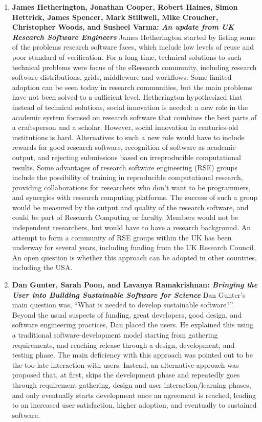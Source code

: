 \documentclass[11pt, oneside]{amsart}
\begin{document}
\begin{enumerate}
\item \textbf{James Hetherington, Jonathan Cooper, Robert Haines, Simon
Hettrick, James Spencer, Mark Stillwell, Mike Croucher, Christopher Woods, and
Susheel Varma: \textit{An update from UK Research Software Engineers}} James
Hetherington started by listing some of the problems research software faces,
which include low levels of reuse and poor standard of verification. For a long
time, technical solutions to such technical problems were focus of the eResearch
community, including research software distributions, grids, middleware and
workflows. Some limited adoption can be seen today in research communities, but
the main problems have not been solved to a sufficient level. Hetherington
hypothesized that instead of technical solutions, social innovation is needed: a
new role in the academic system focused on research software that combines the
best parts of a craftsperson and a scholar. However, social innovation in
centuries-old institutions is hard. Alternatives to such a new role would have
to include rewards for good research software, recognition of software as
academic output, and rejecting submissions based on irreproducible computational
results. Some advantages of research software engineering (RSE) groups include
the possibility of training in reproducible computational research, providing
collaborations for researchers who don't want to be programmers, and synergies
with research computing platforms. The success of such a group would be measured
by the output and quality of the research software, and could be part of
Research Computing or faculty. Members would not be independent researchers, but
would have to have a research background. An attempt to form a community of RSE
groups within the UK has been underway for several years, including funding from
the UK Research Council. An open question is whether this approach can be
adopted in other countries, including the USA.

\item \textbf{Dan Gunter, Sarah Poon, and Lavanya Ramakrishnan: \textit{Bringing
the User into Building Sustainable Software for Science}} Dan Gunter's main
question was, ``What is needed to develop sustainable software?''. Beyond the
usual suspects of funding, great developers, good design, and software
engineering practices, Dan placed the users. He explained this using a
traditional software-development model starting from gathering requirements, and
reaching release through a design, development, and testing phase. The main
deficiency with this approach was pointed out to be the too-late interaction
with users. Instead, an alternative approach was proposed that, at first, skips
the development phase and repeatedly goes through requirement gathering, design
and user interaction/learning phases, and only eventually starts development
once an agreement is reached, leading to an increased user satisfaction, higher
adoption, and eventually to sustained software.


\end{enumerate}
\end{document}
